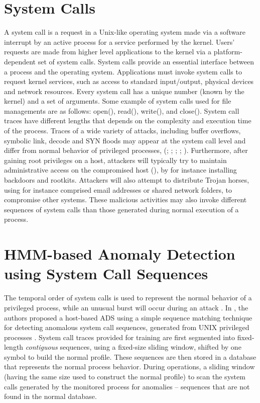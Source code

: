 \section{System Calls}
\label{sec:system-calls}
A system call is a request in a Unix-like operating system made via a software interrupt by an active process for a service performed by the kernel.
Users' requests are made from higher level applications  to the kernel via a platform-dependent set of system calls. System calls provide an essential interface between a process and the operating system. Applications must invoke system calls to request kernel services, such as access to standard input/output, physical devices and network resources. Every system call has a unique number (known by the kernel) and a set of arguments. Some example of system calls used for file managements are as follows: open(), read(), write(), and close(). System call traces have different lengths that depends on the complexity and execution time of the process.
Traces of a wide variety of attacks, including buffer overflows, symbolic link, decode and SYN floods may appear at the system call level and differ from normal behavior of privileged processes, (\cite{Forrest1996}; \cite{Hofmeyr1998}; \cite{Kosoresow1997}; \cite{Somaayaji2002}; \cite{Warrender1999}). Furthermore, after gaining root privileges on a host, attackers will typically try to maintain administrative access on the compromised host (\cite{Mitnick2005}), by for instance installing backdoors and rootkits. Attackers will also attempt to distribute Trojan horses, using for instance comprised email addresses or shared network folders, to compromise other systems. These malicious activities may also invoke different sequences of system calls than those generated during normal execution of a process.

\section{HMM-based Anomaly Detection using System Call Sequences}
\label{sec:ads-hmm}


The temporal order of system calls is used to represent the normal behavior of a privileged process, while an unusual burst will occur during an attack \cite{Forrest1996,Warrender1999}.
In \cite{Forrest1996,Warrender1999}, the authors proposed a host-based ADS using a simple sequence matching technique for detecting anomalous system call sequences, generated from UNIX privileged processes \cite{Forrest1996}.
System call traces provided for training are first segmented into fixed-length \textit{contiguous} sequences, using a fixed-size sliding window, shifted by one symbol to build the normal profile.
These sequences are then stored in a database that represents the normal process behavior.
During operations, a sliding window (having the same size used to construct the normal profile) to scan the system calls generated by the monitored process for anomalies -- sequences that are not found in the normal database.

